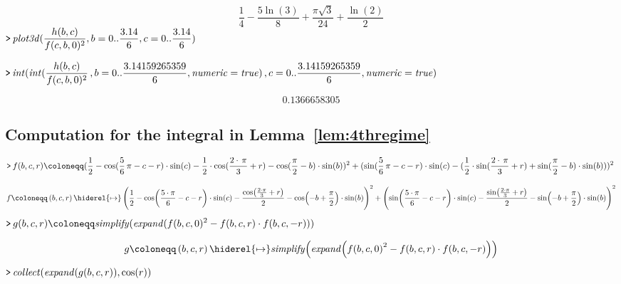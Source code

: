 \documentclass{article}
\theoremstyle{definition}
\newcounter{col}
\begin{document}
\begin{dmath}\label{(6)'}
\frac{1}{4}-\frac{5 \ln \! \left(3\right)}{8}+\frac{\pi  \sqrt{3}}{24}+\frac{\ln \! \left(2\right)}{2}
\end{dmath}
\mapleinput
{$ \displaystyle \texttt{>\,} \mathit{plot3d} (\frac{h (b ,c)}{f (c ,b ,0)^{2}},b =0..\frac{ 3.14}{6},c =0..\frac{ 3.14}{6})\, $}

{}
\mapleinput
{$ \displaystyle \texttt{>\,} \mathit{int} (\mathit{int} (\frac{h (b ,c)}{f (c ,b ,0)^{2}}\,,b =0..\frac{ 3.14159265359}{6},\mathit{numeric} =\mathit{true})\,,c =0..\frac{ 3.14159265359}{6},\mathit{numeric} =\mathit{true}) $}

\begin{dmath}\label{(7)'}
 0.1366658305
\end{dmath}


\subsection{Computation for the integral in Lemma~\ref{lem:4thregime}}\label{subsec:integral_v3}


\mapleinput
{$ \displaystyle \texttt{>\,} f (b ,c ,r)\coloneqq (\frac{1}{2}-\cos (\frac{5}{6}\,\pi -c -r)\cdot \sin (c)-\frac{1}{2}\cdot \cos (\frac{2\cdot \,\pi}{3}+r)-\cos (\frac{\pi}{2}-b)\cdot \sin (b))^{2}+(\sin (\frac{5}{6}\,\pi -c -r)\cdot \sin (c)-(\frac{1}{2}\cdot \sin (\frac{2\cdot \,\pi}{3}+r)+\sin (\frac{\pi}{2}-b)\cdot \sin (b)))^{2}\, $}

\begin{dmath}\label{(1)''}
f \coloneqq \left(b ,c ,r \right)\hiderel{\mapsto }\left(\frac{1}{2}-\cos \! \left(\frac{5\cdot \pi}{6}-c -r \right)\cdot \sin \! \left(c \right)-\frac{\cos \! \left(\frac{2\cdot \pi}{3}+r \right)}{2}-\cos \! \left(-b +\frac{\pi}{2}\right)\cdot \sin \! \left(b \right)\right)^{2}+\left(\sin \! \left(\frac{5\cdot \pi}{6}-c -r \right)\cdot \sin \! \left(c \right)-\frac{\sin \! \left(\frac{2\cdot \pi}{3}+r \right)}{2}-\sin \! \left(-b +\frac{\pi}{2}\right)\cdot \sin \! \left(b \right)\right)^{2}
\end{dmath}
\mapleinput
{$ \displaystyle \texttt{>\,} g (b ,c ,r)\coloneqq \mathit{simplify} (\mathit{expand} (f (b ,c ,0)^{2}-f (b ,c ,r)\cdot f (b ,c ,-r)))\, $}

\begin{dmath}\label{(2)''}
g \coloneqq \left(b ,c ,r \right)\hiderel{\mapsto }\mathit{simplify} \! \left(\mathit{expand} \! \left(f \! \left(b ,c ,0\right)^{2}-f \! \left(b ,c ,r \right)\cdot f \! \left(b ,c ,-r \right)\right)\right)
\end{dmath}
\mapleinput
{$ \displaystyle \texttt{>\,} \mathit{collect} (\mathit{expand} (g (b ,c ,r)),\cos (r))\, $}
\end{document}
